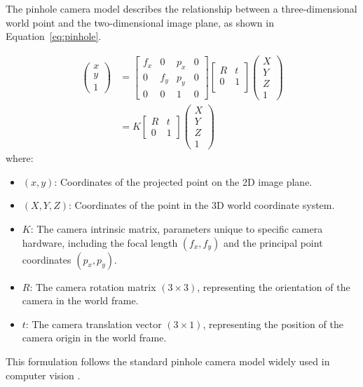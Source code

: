 \documentclass[journal]{IAENGtran}
\begin{document}
The pinhole camera model describes the relationship between a three-dimensional
world point and the two-dimensional image plane, as shown in Equation~\ref{eq:pinhole}.

\begin{equation} \label{eq:pinhole}
\begin{split}
\begin{pmatrix} x \\ y \\ 1 \end{pmatrix} &=
\begin{bmatrix}
f_{x} & 0 & p_{x} & 0 \\
0 & f_{y} & p_{y} & 0 \\
0 & 0 & 1     & 0
\end{bmatrix}
\begin{bmatrix}
R & t \\
0 & 1 \\
\end{bmatrix}
\begin{pmatrix} X \\ Y \\ Z \\ 1 \end{pmatrix} \\
&= K \begin{bmatrix} R & t \\ 0 & 1 \end{bmatrix}
\begin{pmatrix} X \\ Y \\ Z \\ 1 \end{pmatrix}
\end{split}
\end{equation}
where:
\begin{itemize}
    \item $(x, y)$: Coordinates of the projected point on the 2D image plane.
    \item $(X, Y, Z)$: Coordinates of the point in the 3D world coordinate system.
    \item $K$: The camera intrinsic matrix, parameters unique to specific camera hardware,
               including the focal length $(f_x, f_y)$ and the principal point coordinates $(p_x, p_y)$.
    \item $R$: The camera rotation matrix $(3 \times 3)$, representing the orientation
               of the camera in the world frame.
    \item $t$: The camera translation vector $(3 \times 1)$, representing the position
               of the camera origin in the world frame.
\end{itemize}
This formulation follows the standard pinhole camera model widely used in computer
vision \cite{Hartley2003,Szeliski2011}.
\end{document}
